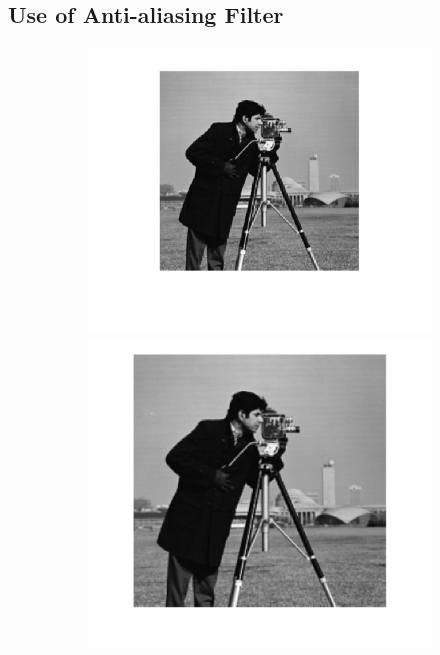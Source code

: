 \documentclass{article}
\begin{document}
\subsection*{Use of Anti-aliasing Filter}
\begin{figure}[h!]
	\centering
	\begin{subfigure}[t]{0.3\textwidth}
		\centering
		\includegraphics[width=\linewidth]{./output_images/DOWN_anti-alias_nearest_scale_0_500000.png}
		\includegraphics[width=\linewidth]{./output_images/UP_anti-alias_nearest_scale_0_500000.png}

\end{subfigure}
\end{figure}
\end{document}
